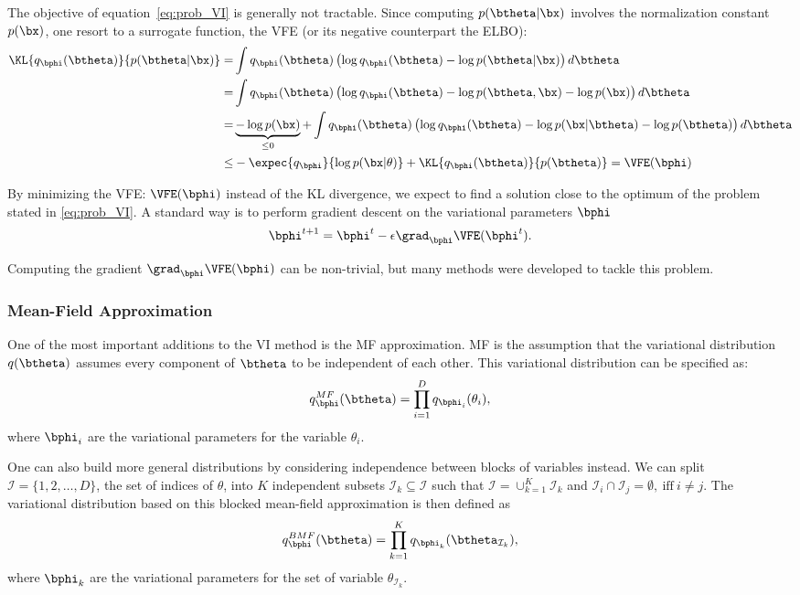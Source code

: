 The objective of equation~\eqref{eq:prob_VI} is generally not tractable.
Since computing $p(\btheta|\bx)$ involves the normalization constant $p(\bx)$, one resort to a surrogate function, the \ac{VFE} (or its negative counterpart the \ac{ELBO}):
\begin{align}
\KL{q_{\bphi}(\btheta)}{p(\btheta|\bx)} =& \int q_{\bphi}(\btheta) \left(\log q_{\bphi}(\btheta) - \log p(\btheta|\bx)\right)d\btheta\\
=&\int q_{\bphi}(\btheta) \left(\log q_{\bphi}(\btheta) - \log p(\btheta, \bx) - \log p(\bx)\right)d\btheta\\
=&\underbrace{- \log p(\bx)}_{\leq 0} + \int q_{\bphi}(\btheta) \left(\log q_{\bphi}(\btheta) - \log p(\bx|\btheta)- \log p(\btheta) \right)d\btheta\\
\leq& -\expec{q_{\bphi}}{\log p(\bx|\theta)} + \KL{q_{\bphi}(\btheta)}{p(\btheta)} = \VFE(\bphi)
\end{align}


By minimizing the \ac{VFE}: $\VFE(\bphi)$ instead of the \ac{KL} divergence, we expect to find a solution close to the optimum of the problem stated in \eqref{eq:prob_VI}.
A standard way is to perform gradient descent on the variational parameters $\bphi$
\begin{align}
\bphi^{t+1} = \bphi^{t} - \epsilon \grad_{\bphi}\VFE(\bphi^{t}).
\end{align}

Computing the gradient $\grad_{\bphi}\VFE(\bphi)$ can be non-trivial, but many methods were developed to tackle this problem.

\subsubsection{Mean-Field Approximation}

One of the most important additions to the \ac{VI} method is the \ac{MF} approximation.
\ac{MF} is the assumption that the variational distribution $q(\btheta)$ assumes every component of $\btheta$ to be independent of each other.
This variational distribution can be specified as:
\begin{align}
q^{MF}_{\bphi}(\btheta) = \prod_{i=1}^D q_{\bphi_i}(\theta_i),
\end{align}
where $\bphi_i$ are the variational parameters for the variable $\theta_i$.

One can also build more general distributions by considering independence between blocks of variables instead.
We can split $\mathcal{I}=\{1,2,\ldots,D\}$, the set of indices of $\theta$, into $K$ independent subsets $\mathcal{I}_k \subseteq \mathcal{I}$ such that  $\mathcal{I} = \cup_{k=1}^K \mathcal{I}_{k}$ and $\mathcal{I}_i \cap \mathcal{I}_j=\emptyset,~\mathrm{iff}~i \neq j$.
The variational distribution based on this blocked mean-field approximation is then defined as
\begin{align}
    q^{BMF}_{\bphi}(\btheta) = \prod_{k=1}^K q_{\bphi_k}(\btheta_{\mathcal{I}_k}),
\end{align}
where $\bphi_k$ are the variational parameters for the set of variable $\theta_{\mathcal{I}_k}$.
